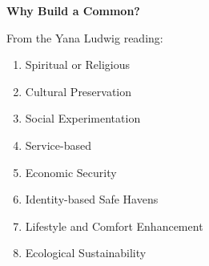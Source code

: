 \documentclass{article}
\begin{document}
\pagebreak
{\huge \textbf{Why Build a Common?}}

From the Yana Ludwig reading:

\begin{enumerate}
	\item Spiritual or Religious
	\item 	Cultural Preservation
	\item 	Social Experimentation
	\item 	Service-based
	\item 	Economic Security
	\item 	Identity-based Safe Havens
	\item 	Lifestyle and Comfort Enhancement
	\item 	Ecological Sustainability
\end{enumerate}
\end{document}
